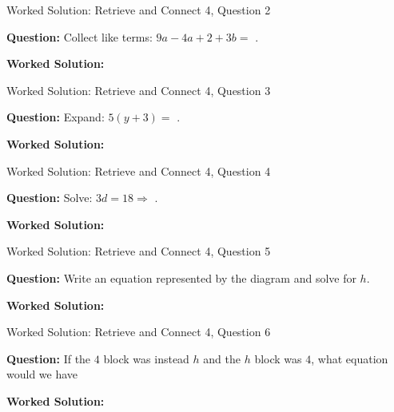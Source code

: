 \documentclass{beamer}
\newcommand{\ablank}[1]{%
  \alt<2>{\textcolor{red}{#1}}{\underline{\phantom{#1}}}%
}
\newcommand{\ashow}[1]{\uncover<2->{\textcolor{red}{\small #1}}}
\newcommand{\ashowq}[1]{\alt<2->{\textcolor{red}{\small #1}}{?}}
\begin{document}
\begin{frame}{Worked Solution: Retrieve and Connect 4, Question 2}

\textbf{Question:} Collect like terms: $9a-4a+2+3b=$\ablank{$5a+2+3b$}.

\textbf{Worked Solution:} \ashow{$9a-4a=5a$; the constant $2$ and the $b$-term $3b$ stay separate, so $5a+2+3b$.}

\end{frame}

\begin{frame}{Worked Solution: Retrieve and Connect 4, Question 3}

\textbf{Question:} Expand: $5(y+3)=$\ablank{$5y+15$}.

\textbf{Worked Solution:} \ashow{$5(y+3)=5y+5\cdot3=5y+15$.}

\end{frame}

\begin{frame}{Worked Solution: Retrieve and Connect 4, Question 4}

\textbf{Question:} Solve: $3d=18 \Rightarrow$\ablank{$d=6$}.

\textbf{Worked Solution:} \ashow{Divide both sides by $3$: $d=18/3=6$.}

\end{frame}

\begin{frame}{Worked Solution: Retrieve and Connect 4, Question 5}

\textbf{Question:} Write an equation represented by the diagram and solve for $h$.

\textbf{Worked Solution:} \ashow{The diagram gives $h+4+6=20$, so $h+10=20$, hence $h=10$.}

\end{frame}

\begin{frame}{Worked Solution: Retrieve and Connect 4, Question 6}

\textbf{Question:} If the $4$ block was instead $h$ and the $h$ block was $4$, what equation would we have\ashowq{~$4+h+6=20$.}

\textbf{Worked Solution:} \ashow{After swapping the labels, the equation is $4+h+6=20$, which still gives $h=10$.}

\end{frame}
\end{document}
